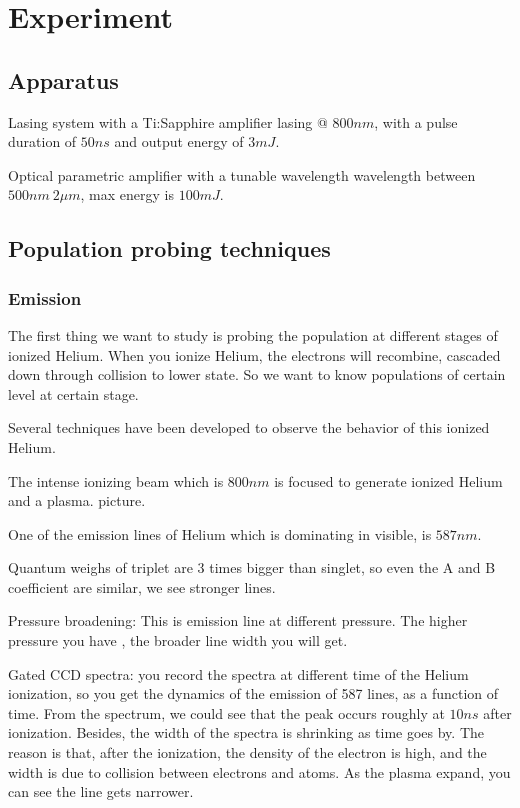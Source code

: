 \chapter{Experiment\label{ch:experiment}}
\section{Apparatus}
Lasing system with a Ti:Sapphire amplifier lasing @ $800nm$, with a
pulse duration of $50ns$ and output energy of $3mJ$.

Optical parametric amplifier with a tunable wavelength wavelength
between $500nm ~ 2\mu m$, max energy is $100mJ$.
\section{Population probing techniques}
\subsection{Emission}
The first thing we want to study is probing the population at
different stages of ionized Helium. When you ionize Helium, the
electrons will recombine, cascaded down through collision to lower
state. So we want to know populations of certain level at certain
stage.

Several techniques have been developed to observe the behavior of this
ionized Helium.

The intense ionizing beam which is $800nm$ is focused to generate
ionized Helium and a plasma.
picture.

One of the emission lines of Helium which is dominating in visible, is
$587nm$.

Quantum weighs of triplet are 3 times bigger than singlet, so even the
A and B coefficient are similar, we see stronger lines.

Pressure broadening:
This is emission line at different pressure. The higher pressure you
have , the broader line width you will get.

Gated CCD spectra:
you record the spectra at different time of the Helium ionization, so
you get the dynamics of the emission of 587 lines, as a function of
time. From the spectrum, we could see that the peak occurs roughly at
$10ns$ after ionization. Besides, the width of the spectra is
shrinking as time goes by. The reason is that, after the ionization,
the density of the electron is high, and the width is due to collision
between electrons and atoms. As the plasma expand, you can see the
line gets narrower.

